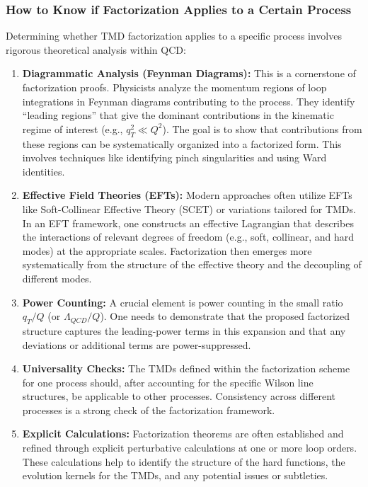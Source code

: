 \documentclass[11pt]{article}
\begin{document}
\subsubsection{How to Know if Factorization Applies to a Certain Process}

Determining whether TMD factorization applies to a specific process involves rigorous theoretical analysis within QCD:
\begin{enumerate}
  \item \textbf{Diagrammatic Analysis (Feynman Diagrams):} This is a cornerstone of factorization proofs. Physicists analyze the momentum regions of loop integrations in Feynman diagrams contributing to the process. They identify ``leading regions'' that give the dominant contributions in the kinematic regime of interest (e.g., $q_T^2 \ll Q^2$). The goal is to show that contributions from these regions can be systematically organized into a factorized form. This involves techniques like identifying pinch singularities and using Ward identities.
  \item \textbf{Effective Field Theories (EFTs):} Modern approaches often utilize EFTs like Soft-Collinear Effective Theory (SCET) or variations tailored for TMDs. In an EFT framework, one constructs an effective Lagrangian that describes the interactions of relevant degrees of freedom (e.g., soft, collinear, and hard modes) at the appropriate scales. Factorization then emerges more systematically from the structure of the effective theory and the decoupling of different modes.
  \item \textbf{Power Counting:} A crucial element is power counting in the small ratio $q_T/Q$ (or $\Lambda_{QCD}/Q$). One needs to demonstrate that the proposed factorized structure captures the leading-power terms in this expansion and that any deviations or additional terms are power-suppressed.
  \item \textbf{Universality Checks:} The TMDs defined within the factorization scheme for one process should, after accounting for the specific Wilson line structures, be applicable to other processes. Consistency across different processes is a strong check of the factorization framework.
  \item \textbf{Explicit Calculations:} Factorization theorems are often established and refined through explicit perturbative calculations at one or more loop orders. These calculations help to identify the structure of the hard functions, the evolution kernels for the TMDs, and any potential issues or subtleties.
\end{enumerate}
\end{document}
